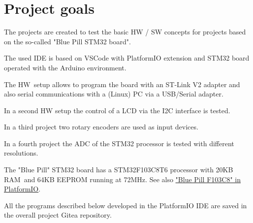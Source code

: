 \documentclass[11pt, oneside]{scrartcl}   	%
\begin{document}
\newpage
\thispagestyle{empty}
\tableofcontents
\newpage

\newpage
\thispagestyle{empty}
\listoffigures
\listoftables

\newpage
\pagestyle{scrheadings}
\section{Project goals}
The projects are created to test the basic HW / SW concepts for projects based on the so-called "Blue Pill STM32 board".

The used IDE is based on VSCode with PlatformIO extension and STM32 board operated with the Arduino environment.

The HW setup allows to program the board with an ST-Link V2 adapter and also serial communications with a (Linux) PC
via a USB/Serial adapter.

In a second HW setup the control of a LCD via the I2C interface is tested.

In a third project two rotary encoders are used as input devices.

In a fourth project the ADC of the STM32 processor is tested with different resolutions.

The "Blue Pill" STM32 board has a STM32F103C8T6 processor with 20KB RAM and 64KB EEPROM running at 72MHz.
See also \href{https://docs.platformio.org/en/latest//boards/ststm32/bluepill_f103c8.html}{"Blue Pill F103C8" in PlatformIO}.

All the programs described below developed in the PlatformIO IDE are saved in the overall project Gitea repository.
\end{document}
